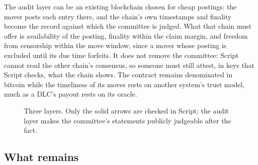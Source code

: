 \documentclass[11pt]{article}
\begin{document}
The audit layer can be an existing blockchain chosen for cheap
postings: the mover posts each entry there, and the chain's own
timestamps and finality become the record against which the committee
is judged. What that chain must offer is availability of the posting,
finality within the claim margin, and freedom from censorship within
the move window, since a mover whose posting is excluded until its due
time forfeits. It does not remove the committee: Script cannot read the
other chain's consensus, so someone must still attest, in keys that
Script checks, what the chain shows. The contract remains denominated
in bitcoin while the timeliness of its moves rests on another system's
trust model, much as a DLC's payout rests on its oracle.

\begin{figure}[H]
\centering
{}
\caption{Three layers. Only the solid arrows are checked in Script; the
audit layer makes the committee's statements publicly judgeable after
the fact.}
\label{fig:layers}
\end{figure}

\subsection{What remains}
\end{document}
